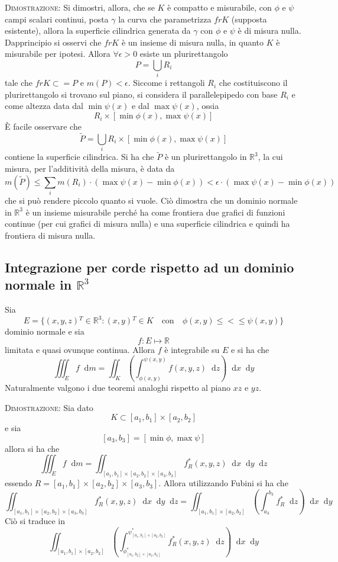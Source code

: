 \documentclass[a4paper]{extarticle}
\newcommand*\dif{\mathop{}\!\mathrm{d}}
\begin{document}
\vspace{2em}
\noindent
\normalfont \normalsize
\textsc{Dimostrazione}: Si dimostri, allora, che se $K$ è compatto e misurabile, con $\phi$ e $\psi$ campi scalari continui, posta $\gamma$ la curva che parametrizza $fr K$ (supposta esistente), allora la superficie cilindrica generata da $\gamma$ con $\phi$ e $\psi$ è di misura nulla.\\
Dapprincipio si osservi che $fr K$ è un insieme di misura nulla, in quanto $K$ è misurabile per ipotesi. Allora $\forall \epsilon > 0$ esiste un plurirettangolo
\[P = \bigcup_i R_i\]
tale che $fr K \subset = P$ e $m(P) < \epsilon$. Siccome i rettangoli $R_i$ che costituiscono il plurirettangolo si trovano sul piano, si considera il parallelepipedo con base $R_i$ e come altezza data dal $\min \psi(x)$ e dal $\max \psi(x)$, ossia
\[R_i \times [\min \phi(x), \max \psi(x)]\]
È facile osservare che
\[\widetilde{P} = \bigcup_i R_i \times [\min \phi(x), \max \psi(x)]\]
contiene la superficie cilindrica. Si ha che $\widetilde{P}$ è un plurirettangolo in $\mathbb{R}^3$, la cui misura, per l'additività della misura, è data da
\[m(\widetilde{P}) \leq \sum_i m(R_i) \cdot (\max \psi(x) - \min \phi(x)) < \epsilon \cdot (\max \psi(x) - \min \phi(x))\]
che si può rendere piccolo quanto si vuole. Ciò dimostra che un dominio normale in $\mathbb{R}^3$ è un insieme misurabile perché ha come frontiera due grafici di funzioni continue (per cui grafici di misura nulla) e una superficie cilindrica e quindi ha frontiera di misura nulla.

\vspace{1em}
\subsection{Integrazione per corde rispetto ad un dominio normale in $\mathbb{R}^3$}
Sia
\[E=\{(x,y,z){^T} \in \mathbb{R}^3 : (x,y){^T} \in K \hspace{1em} \text{con} \hspace{1em} \phi(x,y) \leq < \leq \psi(x,y)\}\]
dominio normale e sia
\[f : E \longmapsto \mathbb{R}\]
limitata e quasi ovunque continua. Allora $f$ è integrabile su $E$ e si ha che
\[\iiint_E f \dif m = \iint_K \left(\int_{\phi(x,y)}^{\psi(x,y)} f(x,y,z) \dif z\right) \dif x \dif y\]
Naturalmente valgono i due teoremi analoghi rispetto al piano $xz$ e $yz$.

\vspace{2em}
\noindent
\normalfont \normalsize
\textsc{Dimostrazione}: Sia dato
\[K \subset [a_1,b_1] \times [a_2,b_2]\]
e sia
\[[a_3,b_3] = [\min \phi, \max \psi]\]
allora si ha che
\[\iiint_E f \dif m = \iint_{[a_1,b_1]\times[a_2,b_2]\times[a_3,b_3]} f^*_R (x,y,z) \dif x \dif y \dif z\]
essendo $R=[a_1,b_1]\times[a_2,b_2]\times[a_3,b_3]$. Allora utilizzando Fubini si ha che
\[\iint_{[a_1,b_1]\times[a_2,b_2]\times[a_3,b_3]} f^*_R (x,y,z) \dif x \dif y \dif z = \iint_{[a_1,b_1]\times[a_2,b_2]} \left(\int_{a_3}^{b_3} f^*_R \dif z\right) \dif x \dif y\]
Ciò si traduce in
\[\iint_{[a_1,b_1]\times[a_2,b_2]} \left(\int_{\phi^*_{[a_1,b_2]\times[a_2,b_2]}}^{\psi^*_{[a_1,b_1]\times[a_2,b_2]}} f^*_R (x,y,z) \dif z\right) \dif x \dif y\]
\end{document}
